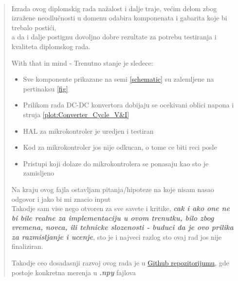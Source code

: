 \documentclass[a4paper, 11pt]{article}   %
\begin{document}
\newpage %

\,

\vfill



\begin{abstract}
    Izrada ovog diplomskig rada nažalost i dalje traje, većim delom zbog izražene neodlučnosti u domenu odabira komponenata i gabarita koje bi trebalo postići,\\
     a da i dalje postignu dovoljno dobre rezultate za potrebu testiranja i kvaliteta diplomskog rada.
    
    \vspace{1cm}
    
    With that in mind - Trenutno stanje je sledece:
    \begin{itemize}
        \item Sve komponente prikazane na semi \ref{schematic} su zalemljene na pertinaksu \ref{fig}
        \item Prilikom rada DC-DC konvertora dobijaju se ocekivani oblici napona i struja \ref{plot:Converter_Cycle_V&I}
        \item HAL za mikrokontroler je uredjen i testiran
        \item Kod za mikrokontroler jos nije odkucan, o tome ce biti reci posle
        \item Pristupi koji dolaze do mikrokontrolera se ponasaju kao sto je zamisljeno
    \end{itemize}
    
    \vspace{1cm}
    
    Na kraju ovog fajla ostavljam pitanja/hipoteze na koje nisam nasao odgovor i jako bi mi znacio input\\
    Takodje sam vise nego otvoren za sve savete i kritike, \textit{\textbf{cak i ako one ne bi bile realne za implementaciju u ovom trenutku, bilo zbog vremena, novca,
    ili tehnicke slozenosti - buduci da je ovo prilika za razmisljanje i ucenje}}, sto je i najveci razlog sto ovaj rad jos nije finaliziran.  
    
    
    \vspace{1cm}
    
    Takodje ceo dosadasnji razvoj ovog rada je u \href{https://github.com/NikolaRistanovic/Diplomski_rad}{Github repozitorijumu},
     gde postoje konkretna merenja u \textit{\textbf{.npy}} fajlova

    

    
\end{abstract}
\end{document}

